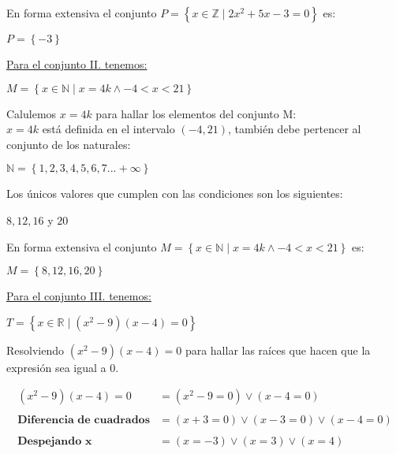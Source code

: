 \documentclass[12pt]{article}
\begin{document}
En forma extensiva el conjunto $P= \left\{x \in \mathbb{Z} \mid 2x^2+5x-3=0\right\}$ es:

\begin{center}
     $P= \left\{-3\right\}$
\end{center}

\underline{Para el conjunto II. tenemos:}

\begin{center}
   $M= \left\{x \in \mathbb{N} \mid x=4k \wedge -4<x<21\right\}$
\end{center}

Calulemos $x=4k$ para hallar los elementos del conjunto M:\\

$x=4k$ está definida en el intervalo $(-4,21)$, también debe pertencer al conjunto de los naturales:

\begin{center}
   $\mathbb{N}= \left\{1,2,3,4,5,6,7...+\infty \right\}$
\end{center}
\newpage
Los únicos valores que cumplen con las condiciones son los siguientes:
\begin{center}
   $8, 12, 16$ y $20$
\end{center}

En forma extensiva el conjunto  $M= \left\{x \in \mathbb{N} \mid x=4k \wedge -4<x<21\right\}$ es:
\begin{center}
     $M= \left\{8, 12, 16, 20\right\}$ 
\end{center}

\underline{Para el conjunto III. tenemos:}

\begin{center}
    $T= \left\{x \in \mathbb{R} \mid (x^2-9)(x-4)=0\right\}$ 
\end{center}
 
Resolviendo $(x^2-9)(x-4)=0$ para hallar las raíces que hacen que la expresión sea igual a $0$.

\begin{equation}
    \begin{split}
   (x^2-9)(x-4)=0 & = (x^2-9=0) \vee (x-4=0) \\\\ \textbf{Diferencia de cuadrados}
         & =  (x+3=0)\vee(x-3=0) \vee (x-4=0)\\\\ \textbf{Despejando x}
        & = (x=-3)\vee(x=3) \vee (x=4)\\\\
    \end{split}
\end{equation}
\end{document}
